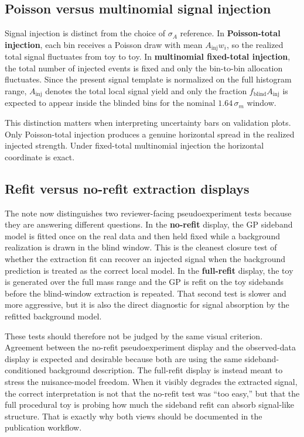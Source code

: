 \subsection{Poisson versus multinomial signal injection}

Signal injection is distinct from the choice of $\sigma_A$ reference. In
\textbf{Poisson-total injection}, each bin receives a Poisson draw with mean
$A_{\mathrm{inj}}w_i$, so the realized total signal fluctuates from toy to toy. In
\textbf{multinomial fixed-total injection}, the total number of injected events is
fixed and only the bin-to-bin allocation fluctuates. Since the present signal template
is normalized on the full histogram range, $A_{\mathrm{inj}}$ denotes the total local
signal yield and only the fraction $f_{\mathrm{blind}}A_{\mathrm{inj}}$ is expected to
appear inside the blinded bins for the nominal $1.64\,\sigma_m$ window.

This distinction matters when interpreting uncertainty bars on validation plots. Only
Poisson-total injection produces a genuine horizontal spread in the realized injected
strength. Under fixed-total multinomial injection the horizontal coordinate is exact.

\subsection{Refit versus no-refit extraction displays}

The note now distinguishes two reviewer-facing pseudoexperiment tests because they are
answering different questions. In the \textbf{no-refit} display, the GP sideband model
is fitted once on the real data and then held fixed while a background realization is
drawn in the blind window. This is the cleanest closure test of whether the extraction
fit can recover an injected signal when the background prediction is treated as the
correct local model. In the \textbf{full-refit} display, the toy is generated over the
full mass range and the GP is refit on the toy sidebands before the blind-window
extraction is repeated. That second test is slower and more aggressive, but it is also
the direct diagnostic for signal absorption by the refitted background model.

These tests should therefore not be judged by the same visual criterion. Agreement
between the no-refit pseudoexperiment display and the observed-data display is expected
and desirable because both are using the same sideband-conditioned background
description. The full-refit display is instead meant to stress the nuisance-model
freedom. When it visibly degrades the extracted signal, the correct interpretation is
not that the no-refit test was ``too easy,'' but that the full procedural toy is
probing how much the sideband refit can absorb signal-like structure. That is exactly
why both views should be documented in the publication workflow.

